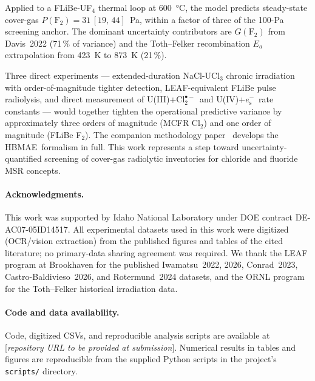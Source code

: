 \documentclass[11pt]{article}
\theoremstyle{plain}
\theoremstyle{definition}
\theoremstyle{remark}
\newcommand{\eS}{\ensuremath{e_{\mathrm{s}}^{-}}\xspace}
\newcommand{\Clt}{\ensuremath{\mathrm{Cl}_2^{\bullet-}}\xspace}
\newcommand{\HBMAE}{HBMAE\xspace}
\newcommand{\Ea}{E_a}
\begin{document}
Applied to a FLiBe-UF$_4$ thermal loop at \SI{600}{\celsius}, the model
predicts steady-state cover-gas $P(\mathrm{F}_2) = 31\,[19,\,44]$~Pa,
within a factor of three of the 100-Pa screening anchor.  The dominant
uncertainty contributors are $G(\mathrm{F}_2)$ from Davis~2022 (71\,\%
of variance) and the Toth--Felker recombination $\Ea$ extrapolation
from 423~K to 873~K (21\,\%).

Three direct experiments --- extended-duration NaCl-UCl$_3$ chronic
irradiation with order-of-magnitude tighter detection, LEAF-equivalent
FLiBe pulse radiolysis, and direct measurement of
U(III)+\Clt\ and U(IV)+\eS\ rate constants --- would together tighten
the operational predictive variance by approximately three orders of
magnitude (MCFR Cl$_2$) and one order of magnitude (FLiBe F$_2$).  The
companion methodology paper~\citep{Tanore2026PaperI} develops the
\HBMAE\ formalism in full.  This work represents a step toward
uncertainty-quantified screening of cover-gas radiolytic inventories for
chloride and fluoride MSR concepts.

\bigskip

\paragraph{Acknowledgments.}
This work was supported by Idaho National Laboratory under
DOE contract DE-AC07-05ID14517.  All experimental datasets used in this
work were digitized (OCR/vision extraction) from the published figures
and tables of the cited literature; no primary-data sharing agreement
was required.  We thank the LEAF program at Brookhaven for the published
Iwamatsu~2022, 2026, Conrad~2023, Castro-Baldivieso~2026, and
Rotermund~2024 datasets, and the ORNL program for the Toth--Felker
historical irradiation data.

\paragraph{Code and data availability.}
Code, digitized CSVs, and reproducible analysis scripts are available at
[\textit{repository URL to be provided at submission}].  Numerical results
in tables and figures are reproducible from the supplied Python scripts
in the project's \texttt{scripts/} directory.




\appendix

\end{document}

